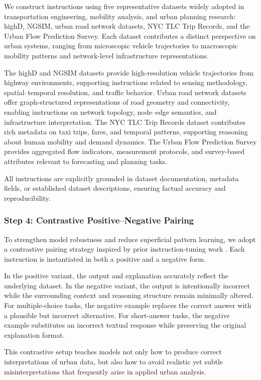 \documentclass[a4paper,fleqn]{cas-sc}
\begin{document}
We construct instructions using five representative datasets widely adopted in transportation engineering, mobility analysis, and urban planning research: highD, NGSIM, urban road network datasets, NYC TLC Trip Records, and the Urban Flow Prediction Survey. Each dataset contributes a distinct perspective on urban systems, ranging from microscopic vehicle trajectories to macroscopic mobility patterns and network-level infrastructure representations.

The highD and NGSIM datasets provide high-resolution vehicle trajectories from highway environments, supporting instructions related to sensing methodology, spatial–temporal resolution, and traffic behavior. Urban road network datasets offer graph-structured representations of road geometry and connectivity, enabling instructions on network topology, node–edge semantics, and infrastructure interpretation. The NYC TLC Trip Records dataset contributes rich metadata on taxi trips, fares, and temporal patterns, supporting reasoning about human mobility and demand dynamics. The Urban Flow Prediction Survey provides aggregated flow indicators, measurement protocols, and survey-based attributes relevant to forecasting and planning tasks.

All instructions are explicitly grounded in dataset documentation, metadata fields, or established dataset descriptions, ensuring factual accuracy and reproducibility.

\subsubsection{Step 4: Contrastive Positive–Negative Pairing}

To strengthen model robustness and reduce superficial pattern learning, we adopt a contrastive pairing strategy inspired by prior instruction-tuning work \cite{ouyang2022training}. Each instruction is instantiated in both a positive and a negative form.

In the positive variant, the output and explanation accurately reflect the underlying dataset. In the negative variant, the output is intentionally incorrect while the surrounding context and reasoning structure remain minimally altered. For multiple-choice tasks, the negative example replaces the correct answer with a plausible but incorrect alternative. For short-answer tasks, the negative example substitutes an incorrect textual response while preserving the original explanation format.

This contrastive setup teaches models not only how to produce correct interpretations of urban data, but also how to avoid realistic yet subtle misinterpretations that frequently arise in applied urban analysis.
\end{document}
